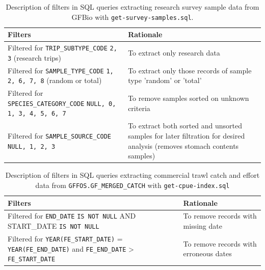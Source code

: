 \documentclass[11pt]{book}\usepackage[]{graphicx}\usepackage[]{color}
\begin{document}
\begin{table}[htpb]
\centering
\caption{Description of filters in SQL queries extracting research survey sample data from GFBio with \texttt{get-survey-samples.sql}.}
\label{tab:sql-surv-samp}
{\tabulinesep=1.6mm
\begin{tabu}{>{\raggedright\arraybackslash}m{2.8in}>{\raggedright\arraybackslash}m{3.2in}}
\toprule
Filters                                                                              & Rationale                                                                                                                                          \\
\midrule
Filtered for \texttt{TRIP\_SUBTYPE\_CODE} \texttt{2, 3} (research trips)                      & To extract only research data                                                                                                             \\
Filtered for \texttt{SAMPLE\_TYPE\_CODE} \texttt{1, 2, 6, 7, 8} (random or total)             & To extract only those records of sample type 'random' or 'total'                                                                          \\
Filtered for \texttt{SPECIES\_CATEGORY\_CODE} \texttt{NULL, 0, 1, 3, 4, 5, 6, 7}              & To remove samples sorted on unknown criteria                                                                                              \\
Filtered for \texttt{SAMPLE\_SOURCE\_CODE} \texttt{NULL, 1, 2, 3}                             & To extract both sorted and unsorted samples for later filtration for desired analysis (removes stomach contents samples)                  \\
\bottomrule
\end{tabu}}
\end{table}

\begin{table}[htpb]
\centering
\caption{Description of filters in SQL queries extracting commercial trawl catch and effort data from \texttt{GFFOS.GF\_MERGED\_CATCH} with \texttt{get-cpue-index.sql}}
\label{tab:sql-cpue-index}
{\tabulinesep=1.6mm
\begin{tabu}{>{\raggedright\arraybackslash}m{2.8in}>{\raggedright\arraybackslash}m{3.2in}}
\toprule
Filters                                                                                                                            & Rationale                                                                 \\
\midrule
Filtered for \texttt{END\_DATE} \texttt{IS NOT NULL} AND {START\_DATE} \texttt{IS NOT NULL}                                        & To remove records with missing date                                       \\
Filtered for \texttt{YEAR(FE\_START\_DATE)} = \texttt{YEAR(FE\_END\_DATE)} and \texttt{FE\_END\_DATE} > \texttt{FE\_START\_DATE}   & To remove records with erroneous dates                                    \\
\bottomrule
\end{tabu}}
\end{table}
\end{document}
